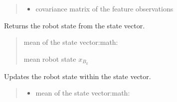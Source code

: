 \documentclass[letterpaper,10pt,english]{sphinxmanual}
\begin{document}
\begin{fulllineitems}
\begin{fulllineitems}
\begin{quote}
\begin{description}
\begin{itemize}
\item {} 
\sphinxAtStartPar
{} \textendash{} covariance matrix of the feature observations

\end{itemize}

\end{description}\end{quote}

\end{fulllineitems}


\begin{fulllineitems}
\label{\detokenize{FEKFMBLocalization:FEKFMBL.FEKFMBL.GetRobotState}}
\pysigstartsignatures
{}
\pysigstopsignatures
\sphinxAtStartPar
Returns the robot state from the state vector.
\begin{quote}\begin{description}
\sphinxAtStartPar
{} \textendash{} mean of the state vector:math:

\sphinxAtStartPar
mean robot state \(x_{B_k}\)

\end{description}\end{quote}

\end{fulllineitems}


\begin{fulllineitems}
\label{\detokenize{FEKFMBLocalization:FEKFMBL.FEKFMBL.SetRobotState}}
\pysigstartsignatures
{}
\pysigstopsignatures
\sphinxAtStartPar
Updates the robot state within the state vector.
\begin{quote}\begin{description}
\begin{itemize}
\item {} 
\sphinxAtStartPar
{} \textendash{} mean of the state vector:math:


\end{itemize}
\end{description}
\end{quote}
\end{fulllineitems}
\end{fulllineitems}
\end{document}
